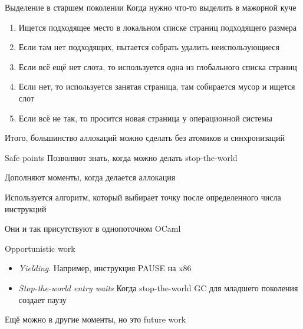 \documentclass[aspectratio=169
  , xcolor={svgnames} 
  , hyperref={ colorlinks,citecolor=DeepPink4
             , linkcolor=DarkRed,urlcolor=DarkBlue}
  , russian
  ]{beamer}
\theoremstyle{exerciseStyle1}
\begin{document}
\begin{frame}{Выделение в старшем поколении}
Когда нужно что-то выделить в мажорной куче
\begin{enumerate}
\item Ищется подходящее место в локальном списке страниц подходящего размера
\item Если там нет подходящих, пытается собрать удалить неиспользующиеся
\item Если всё ещё нет слота, то используется одна из глобального списка страниц
\item Если нет, то используется занятая страница, там собирается мусор и ищется слот
\item Если всё не так, то просится новая страница у операционной системы
\end{enumerate}
Итого, большинство аллокаций можно сделать без атомиков и синхронизаций
\end{frame}



\begin{frame}{Safe points}
Позволяют знать, когда можно делать stop-the-world\vspace{.5cm}

Дополняют моменты, когда делается аллокация \vspace{.5cm}

Используется алгоритм, который выбирает точку после определенного числа инструкций\vspace{.5cm}

Они и так присутствуют в однопоточном OCaml


\end{frame}



\begin{frame}{Opportunistic work}
\begin{itemize}
  \item \textit{Yielding}. Например, инструкция PAUSE на x86
  \item \textit{Stop-the-world entry waits} Когда stop-the-world GC для младшего поколения создает паузу
\end{itemize}

Ещё можно в другие моменты, но это future work
\end{frame}
\end{document}
